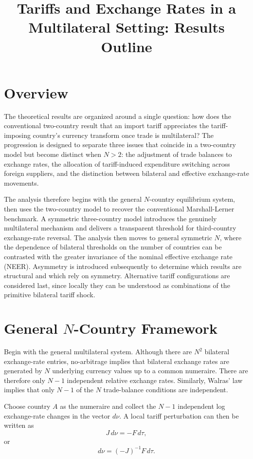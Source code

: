 \documentclass[11pt]{article}
\title{Tariffs and Exchange Rates in a Multilateral Setting: Results Outline}
\date{}
\begin{document}
\maketitle

\section{Overview}

The theoretical results are organized around a single question: how does the conventional two-country result that an import tariff appreciates the tariff-imposing country's currency transform once trade is multilateral? The progression is designed to separate three issues that coincide in a two-country model but become distinct when $N>2$: the adjustment of trade balances to exchange rates, the allocation of tariff-induced expenditure switching across foreign suppliers, and the distinction between bilateral and effective exchange-rate movements.

The analysis therefore begins with the general $N$-country equilibrium system, then uses the two-country model to recover the conventional Marshall-Lerner benchmark. A symmetric three-country model introduces the genuinely multilateral mechanism and delivers a transparent threshold for third-country exchange-rate reversal. The analysis then moves to general symmetric $N$, where the dependence of bilateral thresholds on the number of countries can be contrasted with the greater invariance of the nominal effective exchange rate (NEER). Asymmetry is introduced subsequently to determine which results are structural and which rely on symmetry. Alternative tariff configurations are considered last, since locally they can be understood as combinations of the primitive bilateral tariff shock.

\section{General $N$-Country Framework}

Begin with the general multilateral system. Although there are $N^2$ bilateral exchange-rate entries, no-arbitrage implies that bilateral exchange rates are generated by $N$ underlying currency values up to a common numeraire. There are therefore only $N-1$ independent relative exchange rates. Similarly, Walras' law implies that only $N-1$ of the $N$ trade-balance conditions are independent.

Choose country $A$ as the numeraire and collect the $N-1$ independent log exchange-rate changes in the vector $d\nu$. A local tariff perturbation can then be written as
\[
J\,d\nu=-F\,d\tau,
\]
or
\[
d\nu=(-J)^{-1}F\,d\tau.
\]
\end{document}
